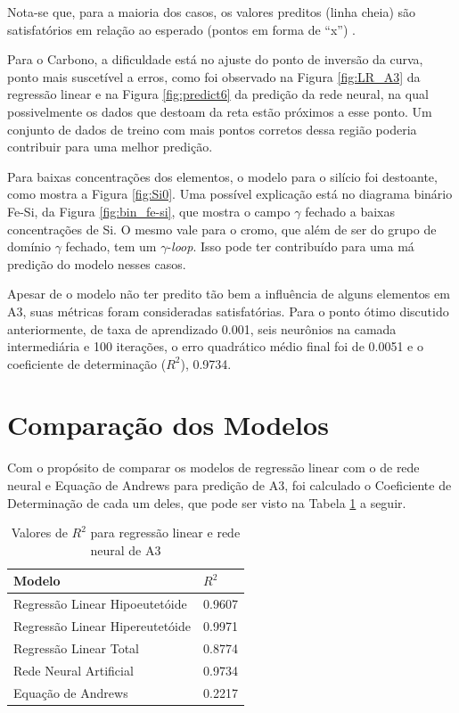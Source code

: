 \documentclass[brazil,tf,epusp]{usp}  %
\begin{document}
Nota-se que, para a maioria dos casos, os valores preditos (linha cheia) são satisfatórios em relação ao esperado (pontos em forma de ``x'') .

Para o Carbono, a dificuldade está no ajuste do ponto de inversão da curva, ponto mais suscetível a erros, como foi observado na Figura \ref{fig:LR_A3} da regressão linear e na Figura \ref{fig:predict6} da predição da rede neural, na qual possivelmente os dados que destoam da reta estão próximos a esse ponto. Um conjunto de dados de treino com mais pontos corretos dessa região poderia contribuir para uma melhor predição.

Para baixas concentrações dos elementos, o modelo para o silício foi destoante, como mostra a Figura \ref{fig:Si0}. Uma possível explicação está no diagrama binário Fe-Si, da Figura \ref{fig:bin_fe-si}, que mostra o campo $\gamma$ fechado a baixas concentrações de Si. O mesmo vale para o cromo, que além de ser do grupo de domínio $\gamma$ fechado, tem um $\gamma$-\textit{loop}. Isso pode ter contribuído para uma má predição do modelo nesses casos.

Apesar de o modelo não ter predito tão bem a influência de alguns elementos em A3, suas métricas foram consideradas satisfatórias. Para o ponto ótimo discutido anteriormente, de taxa de aprendizado 0.001, seis neurônios na camada intermediária e 100 iterações, o erro quadrático médio final foi de 0.0051 e o coeficiente de determinação ($R^{2}$), 0.9734.

\section{Comparação dos Modelos}

Com o propósito de comparar os modelos de regressão linear com o de rede neural e Equação de Andrews para predição de A3, foi calculado o Coeficiente de Determinação de cada um deles, que pode ser visto na Tabela \ref{tab:r2_comparacao} a seguir.

\begin{table}
  \caption{Valores de $R^{2}$ para regressão linear e rede neural de A3}

  \begin{tabular}{ll}
  \hline
  Modelo                          & $R^{2}$ \\
  \hline
  Regressão Linear Hipoeutetóide  & 0.9607  \\
  Regressão Linear Hipereutetóide & 0.9971  \\
  Regressão Linear Total          & 0.8774  \\
  Rede Neural Artificial          & 0.9734  \\
  Equação de Andrews              & 0.2217  \\
  \hline
  \end{tabular}

  \label{tab:r2_comparacao}
\end{table}
\end{document}
